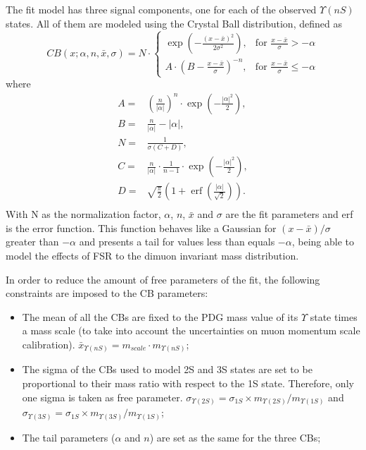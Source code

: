 The fit model has three signal components, one for each of the observed $\Upsilon(nS)$ states. All of them are modeled using the Crystal Ball distribution, defined as
\begin{equation}
  CB(x;\alpha,n,\bar x,\sigma) = N \cdot
  \begin{cases}
    \exp(- \frac{(x - \bar x)^2}{2 \sigma^2}),    & \mbox{for }\frac{x - \bar x}{\sigma} > -\alpha         \\
    A \cdot (B - \frac{x - \bar x}{\sigma})^{-n}, & \mbox{for }\frac{x - \bar x}{\sigma} \leqslant -\alpha
  \end{cases}
\end{equation}
where
\begin{equation}
  \begin{split}
    A = & \left(\frac{n}{\left| \alpha \right|}\right)^n \cdot \exp\left(- \frac {\left| \alpha \right|^2}{2}\right), \\
    B = & \frac{n}{\left| \alpha \right|}  - \left| \alpha \right|, \\
    N = & \frac{1}{\sigma (C + D)}, \\
    C = & \frac{n}{\left| \alpha \right|} \cdot \frac{1}{n-1} \cdot \exp\left(- \frac {\left| \alpha \right|^2}{2}\right), \\
    D = & \sqrt{\frac{\pi}{2}} \left(1 + \operatorname{erf}\left(\frac{\left| \alpha \right|}{\sqrt 2}\right)\right). \\
  \end{split}
\end{equation}
With N as the normalization factor, $\alpha$, $n$, $\bar x$ and $\sigma$ are the fit parameters and erf is the error function. This function behaves like a Gaussian for $(x-\bar x)/\sigma$ greater than $-\alpha$ and presents a tail for values less than equals $-\alpha$, being able to model the effects of FSR to the dimuon invariant mass distribution.

In order to reduce the amount of free parameters of the fit, the following constraints are imposed to the CB parameters:
\begin{itemize}
  \item The mean of all the CBs are fixed to the PDG mass value of its $\Upsilon$ state times a mass scale (to take into account the uncertainties on muon momentum scale calibration). $\bar x_{\Upsilon(nS)} = m_{scale}\cdot m_{\Upsilon(nS)}$;
  \item The sigma of the CBs used to model 2S and 3S states are set to be proportional to their mass ratio with respect to the 1S state. Therefore, only one sigma is taken as free parameter. $\sigma_{\Upsilon(2S)} = \sigma_{1S}\times m_{\Upsilon(2S)}/m_{\Upsilon(1S)}$ and $\sigma_{\Upsilon(3S)} = \sigma_{1S}\times m_{\Upsilon(3S)}/m_{\Upsilon(1S)}$;
  \item The tail parameters ($\alpha$ and $n$) are set as the same for the three CBs;
\end{itemize}

